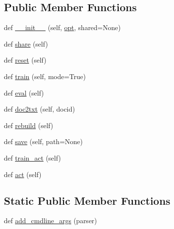 \subsection*{Public Member Functions}
\begin{DoxyCompactItemize}
\item 
def \hyperlink{classparlai_1_1agents_1_1tfidf__retriever_1_1tfidf__retriever_1_1TfidfRetrieverAgent_a41828d27aad3bd78da51c74d24350f46}{\+\_\+\+\_\+init\+\_\+\+\_\+} (self, \hyperlink{classparlai_1_1core_1_1agents_1_1Agent_ab3b45d2754244608c75d4068b90cd051}{opt}, shared=None)
\item 
def \hyperlink{classparlai_1_1agents_1_1tfidf__retriever_1_1tfidf__retriever_1_1TfidfRetrieverAgent_afb395d155be90f557a1e8fc0cb38e94e}{share} (self)
\item 
def \hyperlink{classparlai_1_1agents_1_1tfidf__retriever_1_1tfidf__retriever_1_1TfidfRetrieverAgent_a4d9e8962cb44451758ea13b09b8dbd86}{reset} (self)
\item 
def \hyperlink{classparlai_1_1agents_1_1tfidf__retriever_1_1tfidf__retriever_1_1TfidfRetrieverAgent_abc3ce26084466682f25980e176d3ce38}{train} (self, mode=True)
\item 
def \hyperlink{classparlai_1_1agents_1_1tfidf__retriever_1_1tfidf__retriever_1_1TfidfRetrieverAgent_a97a3e0824539ff7df230ccaee5cdda20}{eval} (self)
\item 
def \hyperlink{classparlai_1_1agents_1_1tfidf__retriever_1_1tfidf__retriever_1_1TfidfRetrieverAgent_af3dec5fd8d3fb89229f00d919bfcd565}{doc2txt} (self, docid)
\item 
def \hyperlink{classparlai_1_1agents_1_1tfidf__retriever_1_1tfidf__retriever_1_1TfidfRetrieverAgent_a434a29fe242e98aef091ec1e277d420f}{rebuild} (self)
\item 
def \hyperlink{classparlai_1_1agents_1_1tfidf__retriever_1_1tfidf__retriever_1_1TfidfRetrieverAgent_af740335de006f8ead33b632afa1c4dcd}{save} (self, path=None)
\item 
def \hyperlink{classparlai_1_1agents_1_1tfidf__retriever_1_1tfidf__retriever_1_1TfidfRetrieverAgent_a424c899b5755606c32c7d6a85989ce92}{train\+\_\+act} (self)
\item 
def \hyperlink{classparlai_1_1agents_1_1tfidf__retriever_1_1tfidf__retriever_1_1TfidfRetrieverAgent_a6113bcdd2792d70156ca64cc57187692}{act} (self)
\end{DoxyCompactItemize}
\subsection*{Static Public Member Functions}
\begin{DoxyCompactItemize}
\item 
def \hyperlink{classparlai_1_1agents_1_1tfidf__retriever_1_1tfidf__retriever_1_1TfidfRetrieverAgent_a3d8b2fdf6981564efc1a4db42029b4f0}{add\+\_\+cmdline\+\_\+args} (parser)
\end{DoxyCompactItemize}
